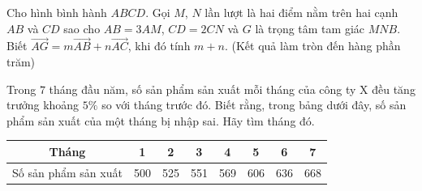 \begin{ex}%
    Cho hình bình hành $ABCD$. Gọi $M$, $N$ lần lượt là hai điểm nằm trên hai cạnh $AB$ và $CD$ sao cho $AB=3AM$, $CD=2CN$ và $G$ là trọng tâm tam giác $MNB$. Biết $\overrightarrow{AG}=m\overrightarrow{AB}+n\overrightarrow{AC}$, khi đó tính $m+n$. (Kết quả làm tròn đến hàng phần trăm)
\end{ex}
\begin{ex}%
    Trong $7$ tháng đầu năm, số sản phẩm sản xuất mỗi tháng của công ty X đều tăng trưởng khoảng $5\%$ so với tháng trước đó. Biết rằng, trong bảng dưới đây, số sản phẩm sản xuất của một tháng bị nhập sai. Hãy tìm tháng đó.
    \begin{center}
        \begin{tabular}{|c|c|c|c|c|c|c|c|}
            \hline Tháng & 1 & 2 & 3 & 4 & 5 & 6 & 7 \\
            \hline Số sản phẩm sản xuất
             & 500 & 525 & 551 & 569 & 606 & 636 & 668 \\
            \hline
        \end{tabular}
    \end{center}
\end{ex}

